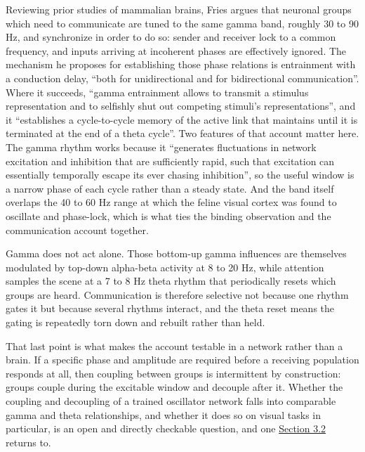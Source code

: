 \documentclass[10pt]{article}
\begin{document}
Reviewing prior studies of mammalian brains, Fries argues that neuronal
groups which need to communicate are tuned to the same gamma band,
roughly 30 to 90 Hz, and synchronize in order to do so: sender and
receiver lock to a common frequency, and inputs arriving at incoherent
phases are effectively ignored. The mechanism he proposes for
establishing those phase relations is entrainment with a conduction
delay, ``both for unidirectional and for bidirectional communication''.
Where it succeeds, ``gamma entrainment allows to transmit a stimulus
representation and to selfishly shut out competing stimuli's
representations'', and it ``establishes a cycle-to-cycle memory of the
active link that maintains until it is terminated at the end of a theta
cycle''. Two features of that account matter here. The gamma rhythm
works because it ``generates fluctuations in network excitation and
inhibition that are sufficiently rapid, such that excitation can
essentially temporally escape its ever chasing inhibition'', so the
useful window is a narrow phase of each cycle rather than a steady
state. And the band itself overlaps the 40 to 60 Hz range at which the
feline visual cortex was found to oscillate and phase-lock, which is
what ties the binding observation and the communication account
together.

Gamma does not act alone. Those bottom-up gamma influences are
themselves modulated by top-down alpha-beta activity at 8 to 20 Hz,
while attention samples the scene at a 7 to 8 Hz theta rhythm that
periodically resets which groups are heard. Communication is therefore
selective not because one rhythm gates it but because several rhythms
interact, and the theta reset means the gating is repeatedly torn down
and rebuilt rather than held.

That last point is what makes the account testable in a network rather
than a brain. If a specific phase and amplitude are required before a
receiving population responds at all, then coupling between groups is
intermittent by construction: groups couple during the excitable window
and decouple after it. Whether the coupling and decoupling of a trained
oscillator network falls into comparable gamma and theta relationships,
and whether it does so on visual tasks in particular, is an open and
directly checkable question, and one \hyperref[sec-3-2]{Section 3.2}
returns to.
\end{document}
